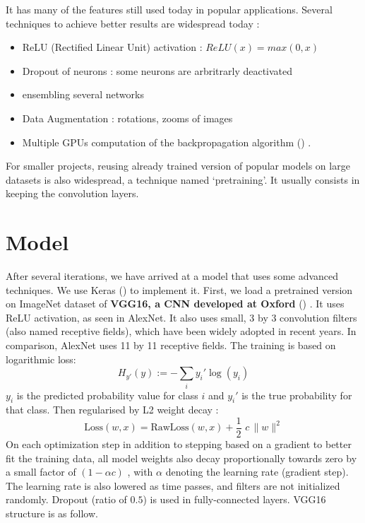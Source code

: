 \documentclass[]{book}
\providecommand{\tightlist}{%
  \setlength{\itemsep}{0pt}\setlength{\parskip}{0pt}}
\begin{document}
It has many of the features still used today in popular applications.
Several techniques to achieve better results are widespread today :

\begin{itemize}
\tightlist
\item
  ReLU (Rectified Linear Unit) activation : \(ReLU(x) = max(0,x)\)
\item
  Dropout of neurons : some neurons are arbritrarly deactivated
\item
  ensembling several networks
\item
  Data Augmentation : rotations, zooms of images
\item
  Multiple GPUs computation of the backpropagation algorithm (\citet{Rumelhart:1986we}) .
\end{itemize}

For smaller projects, reusing already trained version of popular models on large datasets is also widespread, a technique named `pretraining'.
It usually consists in keeping the convolution layers.

\hypertarget{model}{%
\section{Model}\label{model}}

After several iterations, we have arrived at a model that uses some advanced techniques.
We use Keras (\citet{R-keras}) to implement it.
First, we load a pretrained version on ImageNet dataset of \textbf{VGG16, a CNN developed at Oxford} (\citet{simonyan2014deep}) .
It uses ReLU activation, as seen in AlexNet.
It also uses small, 3 by 3 convolution filters (also named receptive fields), which have been widely adopted in recent years.
In comparison, AlexNet uses 11 by 11 receptive fields.
The training is based on logarithmic loss:
\[H_{y'} (y) := - \sum_{i} y_{i}' \log (y_i)\]
\(y_i\) is the predicted probability value for class \(i\) and \(y_i'\) is the true probability for that class.
Then regularised by L2 weight decay :
\[\mbox{Loss}(w,x) = \mbox{RawLoss}(w,x) + \frac{1}{2} \,\, c \,\|w\|^2\]
On each optimization step in addition to stepping based on a gradient to better fit the training data, all model weights also decay proportionally towards zero by a small factor of \((1-\alpha c)\) , with \(\alpha\) denoting the learning rate (gradient step).
The learning rate is also lowered as time passes, and filters are not initialized randomly.
Dropout (ratio of \(0.5\)) is used in fully-connected layers.
VGG16 structure is as follow.
\end{document}
